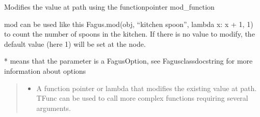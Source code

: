 \documentclass[a4paper,10pt,english]{sphinxmanual}
\begin{document}
\begin{fulllineitems}
\begin{fulllineitems}
\begin{quote}
\begin{description}
\begin{itemize}
\end{itemize}

\end{description}\end{quote}

\end{fulllineitems}


\begin{fulllineitems}
\label{\detokenize{fagus:fagus.Fagus.mod}}
\pysigstartsignatures
{}
\pysigstopsignatures
\sphinxAtStartPar
Modifies the value at path using the function\sphinxhyphen{}pointer mod\_function

\sphinxAtStartPar
mod can be used like this Fagus.mod(obj, “kitchen spoon”, lambda x: x + 1, 1) to count the number of spoons in
the kitchen. If there is no value to modify, the default value (here 1) will be set at the node.

\sphinxAtStartPar
* means that the parameter is a FagusOption, see Fagus\sphinxhyphen{}class\sphinxhyphen{}docstring for more information about options
\begin{quote}\begin{description}
\begin{itemize}
\item {}
\sphinxAtStartPar
{} \textendash{} A function pointer or lambda that modifies the existing value at path. TFunc can be used to
call more complex functions requiring several arguments.


\end{itemize}
\end{description}
\end{quote}
\end{fulllineitems}
\end{fulllineitems}
\end{document}
